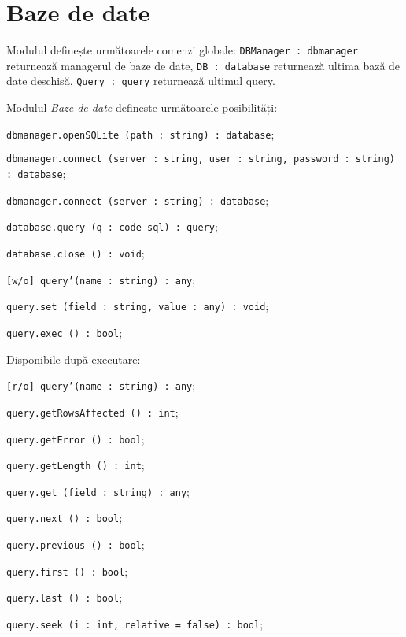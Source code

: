 \section{Baze de date}

Modulul definește următoarele comenzi globale: \texttt{DBManager : dbmanager} returnează managerul de baze de date, \texttt{DB : database} returnează ultima bază de date deschisă, \texttt{Query : query} returnează ultimul query.

Modulul \textit{Baze de date} definește următoarele posibilități:
\begin{icItems}
	\item \texttt{dbmanager.openSQLite (path : string) : database};
	\item \texttt{dbmanager.connect (server : string, user : string, password : string) : database};
	\item \texttt{dbmanager.connect (server : string) : database};
	\item \texttt{database.query (q : code-sql) : query};
	\item \texttt{database.close () : void};
	\item \texttt{[w/o] query'(name : string) : any};
	\item \texttt{query.set (field : string, value : any) : void};
	\item \texttt{query.exec () : bool};
	\item Disponibile după executare:
	\begin{icItems}
		\item \texttt{[r/o] query'(name : string) : any};
		\item \texttt{query.getRowsAffected () : int};
		\item \texttt{query.getError () : bool};
		\item \texttt{query.getLength () : int};
		\item \texttt{query.get (field : string) : any};
		\item \texttt{query.next () : bool};
		\item \texttt{query.previous () : bool};
		\item \texttt{query.first () : bool};
		\item \texttt{query.last () : bool};
		\item \texttt{query.seek (i : int, relative = false) : bool};
	\end{icItems}
\end{icItems}

